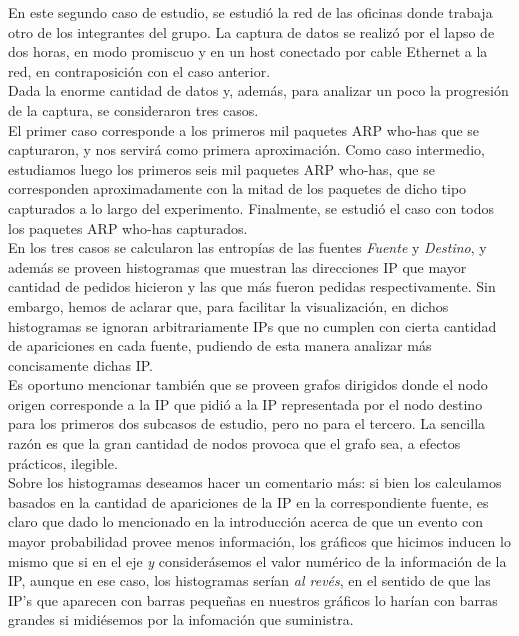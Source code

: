 \indent \indent  En este segundo caso de estudio, se estudió la red de las oficinas donde trabaja otro de los integrantes del grupo. La captura de datos se realizó por el lapso de dos horas, en modo promiscuo y en un host conectado por cable Ethernet a la red, en contraposición con el caso anterior.\\
\indent Dada la enorme cantidad de datos y, además, para analizar un poco la progresión de la captura, se consideraron tres casos.\\
\indent El primer caso corresponde a los primeros mil paquetes ARP who-has que se capturaron, y nos servirá como primera aproximación. Como caso intermedio, estudiamos luego los primeros seis mil paquetes ARP who-has, que se corresponden aproximadamente con la mitad de los paquetes de dicho tipo capturados a lo largo del experimento. Finalmente, se estudió el caso con todos los paquetes ARP who-has capturados.\\
\indent En los tres casos se calcularon las entropías de las fuentes \textit{Fuente} y \textit{Destino}, y además se proveen histogramas que muestran las direcciones IP que mayor cantidad de pedidos hicieron y las que más fueron pedidas respectivamente. Sin embargo, hemos de aclarar que, para facilitar la visualización, en dichos histogramas se ignoran arbitrariamente IPs que no cumplen con cierta cantidad de apariciones en cada fuente, pudiendo de esta manera analizar más concisamente dichas IP.\\
\indent Es oportuno mencionar también que se proveen grafos dirigidos donde el nodo origen corresponde a la IP que pidió a la IP representada por el nodo destino para los primeros dos subcasos de estudio, pero no para el tercero. La sencilla razón es que la gran cantidad de nodos provoca que el grafo sea, a efectos prácticos, ilegible.\\
\indent Sobre los histogramas deseamos hacer un comentario más: si bien los calculamos basados en la cantidad de apariciones de la IP en la correspondiente fuente, es claro que dado lo mencionado en la introducción acerca de que un evento con mayor probabilidad provee menos información, los gráficos que hicimos inducen lo mismo que si en el eje \textit{y} considerásemos el valor numérico de la información de la IP, aunque en ese caso, los histogramas serían \textit{al revés}, en el sentido de que las IP's que aparecen con barras pequeñas en nuestros gráficos lo harían con barras grandes si midiésemos por la infomación que suministra.\\

